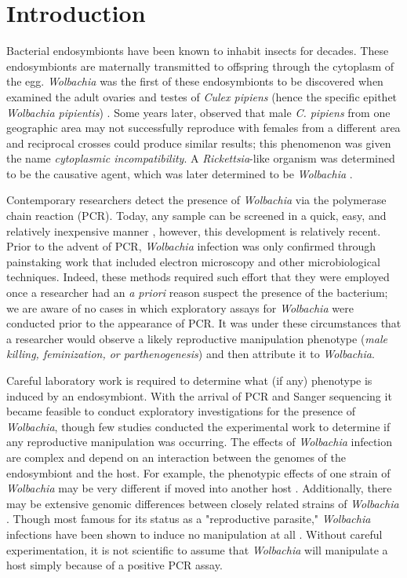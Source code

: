 \documentclass{frontiersSCNS}
\begin{document}
\section{Introduction}

Bacterial endosymbionts have been known to inhabit insects for decades. These endosymbionts are maternally transmitted to offspring through the cytoplasm of the egg. \textit{Wolbachia} was the first of these endosymbionts to be discovered when \citet{Hertig:1924wy} examined the adult ovaries and testes of \textit{Culex pipiens} (hence the specific epithet \textit{Wolbachia pipientis}) \citet{Hertig:1936}. Some years later, \citet{Yen:1971tc} observed that male \textit{C. pipiens} from one geographic area may not successfully reproduce with females from a different area and reciprocal crosses could produce similar results; this phenomenon was given the name \textit{cytoplasmic incompatibility}. A \textit{Rickettsia}-like organism was determined to be the causative agent, which was later determined to be \textit{Wolbachia} \citep{Yen:1973vx}.

Contemporary researchers detect the presence of \textit{Wolbachia} via the polymerase chain reaction (PCR). Today, any sample can be screened in a quick, easy, and relatively inexpensive manner \citep{Baldo:2006p7025,Simoes:2011p11073}, however, this development is relatively recent. Prior to the advent of PCR, \textit{Wolbachia} infection was only confirmed through painstaking work that included electron microscopy and other microbiological techniques. Indeed, these methods required such effort that they were employed once a researcher had an \textit{a priori} reason suspect the presence of the bacterium; we are aware of no cases in which exploratory assays for \textit{Wolbachia} were conducted prior to the appearance of PCR. It was under these circumstances that a researcher would observe a likely reproductive manipulation phenotype (\emph{male killing, feminization, \emph{or} parthenogenesis}) and then attribute it to \textit{Wolbachia}.

Careful laboratory work is required to determine what (if any) phenotype is induced by an endosymbiont. With the arrival of PCR and Sanger sequencing it became feasible to conduct exploratory investigations for the presence of \textit{Wolbachia}, though few studies conducted the experimental work to determine if any reproductive manipulation was occurring. The effects of \textit{Wolbachia} infection are complex and depend on an interaction between the genomes of the endosymbiont and the host. For example, the phenotypic effects of one strain of \textit{Wolbachia} may be very different if moved into another host \citep{Rigaud:2001fv,Hoffmann:2011p11474}. Additionally, there may be extensive genomic differences between closely related strains of \textit{Wolbachia} \citep{Ishmael:2009p8257}. Though most famous for its status as a "reproductive parasite," \textit{Wolbachia} infections have been shown to induce no manipulation at all \citep{Hamm:2014cv,Zhang:2010jl,Zhang:2013eo}. Without careful experimentation, it is not scientific to assume that \textit{Wolbachia} will manipulate a host simply because of a positive PCR assay. 
\end{document}
